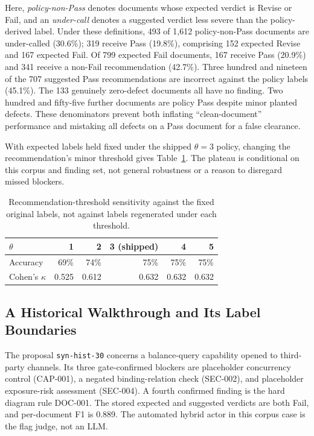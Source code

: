\documentclass[computers,article,submit,moreauthors]{Definitions/mdpi}
\begin{document}
Here, \emph{policy-non-Pass} denotes documents whose expected verdict is Revise or Fail, and an \emph{under-call} denotes a suggested verdict less severe than the policy-derived label. Under these definitions, 493 of 1,612 policy-non-Pass documents are under-called (30.6\%); 319 receive Pass (19.8\%), comprising 152 expected Revise and 167 expected Fail. Of 799 expected Fail documents, 167 receive Pass (20.9\%) and 341 receive a non-Fail recommendation (42.7\%). Three hundred and nineteen of the 707 suggested Pass recommendations are incorrect against the policy labels (45.1\%). The 133 genuinely zero-defect documents all have no finding. Two hundred and fifty-five further documents are policy Pass despite minor planted defects. These denominators prevent both inflating ``clean-document'' performance and mistaking all defects on a Pass document for a false clearance.

With expected labels held fixed under the shipped $\theta=3$ policy, changing the recommendation's minor threshold gives Table~\ref{tab:theta}. The plateau is conditional on this corpus and finding set, not general robustness or a reason to disregard missed blockers.

\begin{table}[!ht]
\caption{Recommendation-threshold sensitivity against the fixed original labels, not against labels regenerated under each threshold.}
\label{tab:theta}
\centering\footnotesize
\begin{tabular}{@{}lrrrrr@{}}
\toprule
$\theta$ & 1 & 2 & 3 (shipped) & 4 & 5 \\
\midrule
Accuracy & 69\% & 74\% & 75\% & 75\% & 75\% \\
Cohen's $\kappa$ & 0.525 & 0.612 & 0.632 & 0.632 & 0.632 \\
\bottomrule
\end{tabular}
\end{table}

\subsection{A Historical Walkthrough and Its Label Boundaries}

The proposal \texttt{syn-hist-30} concerns a balance-query capability opened to third-party channels. Its three gate-confirmed blockers are placeholder concurrency control (CAP-001), a negated binding-relation check (SEC-002), and placeholder exposure-risk assessment (SEC-004). A fourth confirmed finding is the hard diagram rule DOC-001. The stored expected and suggested verdicts are both Fail, and per-document F1 is 0.889. The automated hybrid actor in this corpus case is the flag judge, not an LLM.
\end{document}
